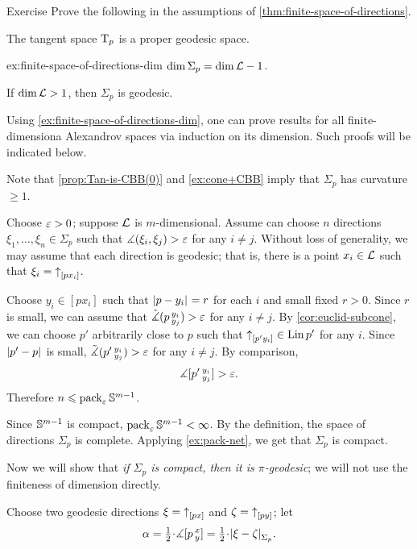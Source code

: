 \begin{thm}{Exercise}\label{ex:finite-tan}
Prove the following in the assumptions of \ref{thm:finite-space-of-directions}.
\begin{subthm}{}
The tangent space $\mathrm{T}_p$ is a proper geodesic space.
\end{subthm}

\begin{subthm}{ex:finite-space-of-directions-dim}
$\operatorname{\rm dim}\nolimits\Sigma_p=\operatorname{\rm dim}\nolimits\mathcal{L}-1$.
\end{subthm}

\begin{subthm}{}
If $\operatorname{\rm dim}\nolimits \mathcal{L}>1$, then $\Sigma_p$ is geodesic.
\end{subthm}


\end{thm}

Using \ref{ex:finite-space-of-directions-dim}, one can prove results for all finite-dimensiona Alexandrov spaces via induction on its dimension.
Such proofs will be indicated below.

Note that \ref{prop:Tan-is-CBB(0)} and \ref{ex:cone+CBB} imply that $\Sigma_p$ has curvature $\ge1$.

Choose $\varepsilon>0$; suppose $\mathcal{L}$ is $m$-dimensional.
Assume can choose $n$ directions $\xi_1,\dots, \xi_n\in \Sigma_p$ such that $\mangle(\xi_i,\xi_j)\z>\eps$ for any $i\ne j$.
Without loss of generality, we may assume that each direction is geodesic;
that is, there is a point $x_i\in \mathcal{L}$ such that $\xi_i={\uparrow}_{[{p}{x_i}]}$.

Choose $y_i\in [px_i]$ such that $\dist{p}{y_i}{}=r$ for each $i$ and small fixed $r>0$.
Since $r$ is small, we can assume that $\tilde\measuredangle(p\,{}^{y_i}_{y_j})>\varepsilon$ for any $i\ne j$.
By \ref{cor:euclid-subcone}, we can choose $p'$ arbitrarily close to $p$ such that ${\uparrow}_{[{p'}{y_i}]}\in \mathop{\rm Lin}\nolimits{p'}$ for any $i$.
Since  $\dist{p'}{p}{}$ is small, $\tilde\measuredangle(p'\,{}^{y_i}_{y_j})>\varepsilon$ for any $i\ne j$.
By comparison, 
\[\measuredangle [p'\,{}^{y_i}_{y_j}]>\varepsilon.\]
Therefore $n\leqslant \operatorname{\rm pack}\nolimits_\varepsilon\mathbb{S}^{m-1}$.

Since $\mathbb{S}^{m-1}$ is compact, $\operatorname{\rm pack}\nolimits_\varepsilon\mathbb{S}^{m-1}<\infty$.
By the definition, the space of directions $\Sigma_p$ is complete. 
Applying \ref{ex:pack-net}, we get that  $\Sigma_p$ is compact.

Now we will show that \textit{if $\Sigma_p$ is compact, then it is $\pi$-geodesic};
we will not use the finiteness of dimension directly.

Choose two geodesic directions $\xi={\uparrow}_{[{p}{x}]}$ and $\zeta={\uparrow}_{[{p}{y}]}$;
let 
\[\alpha\z=\tfrac12\cdot \mangle \hinge pxy=\tfrac12\cdot \dist{\xi}{\zeta}{\Sigma_p}.\]

